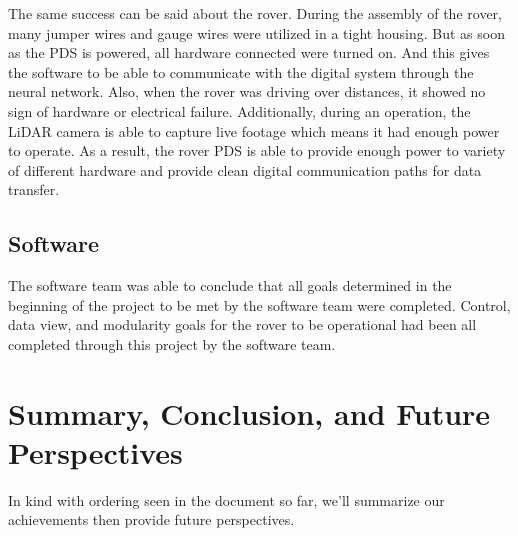 \documentclass[a4paper, 10pt]{article}
\begin{document}
	The same success can be said about the rover. During the assembly of the rover, many jumper wires and gauge wires were utilized in a tight housing. But as soon as the PDS is powered, all hardware connected were turned on. And this gives the software to be able to communicate with the digital system through the neural network. Also, when the rover was driving over distances, it showed no sign of hardware or electrical failure. Additionally, during an operation, the LiDAR camera is able to capture live footage which means it had enough power to operate. As a result, the rover PDS is able to provide enough power to variety of different hardware and provide clean digital communication paths for data transfer.

    \subsection{Software}
    The software team was able to conclude that all goals determined in the beginning of the project to be met by the software team were completed. Control, data view, and modularity goals for the rover to be operational had been all completed through this project by the software team. 

\section{Summary, Conclusion, and Future Perspectives}
In kind with ordering seen in the document so far, we'll summarize our achievements then provide future perspectives.
\end{document}
